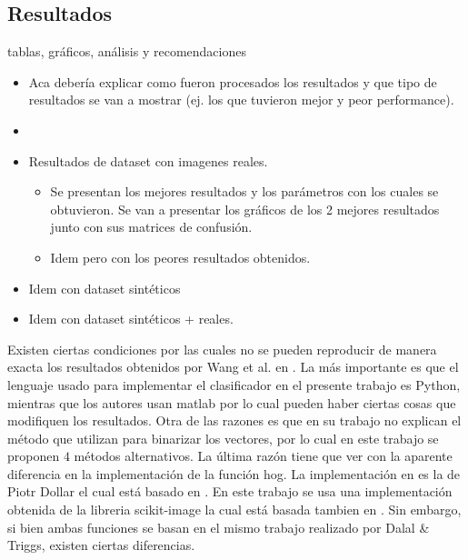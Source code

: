 \newpage
\subsection{Resultados}

\label{subsection:resultados}
	tablas, gráficos, análisis y recomendaciones
	\begin{itemize}
		\item Aca debería explicar como fueron procesados los
                  resultados y que tipo de resultados se van a mostrar (ej. los
                  que tuvieron mejor y peor performance). 
                \item {}
		\item Resultados de dataset con imagenes reales.
		\begin{itemize}
			\item Se presentan los mejores resultados y los parámetros con los cuales se obtuvieron. Se van a presentar los gráficos de los 2 mejores resultados junto con sus matrices de confusión.
			\item Idem pero con los peores resultados obtenidos.
		\end{itemize}
		\item Idem con dataset sintéticos
		\item Idem con dataset sintéticos + reales.

	\end{itemize}
	
	Existen ciertas condiciones por las cuales no se pueden reproducir de manera exacta los resultados obtenidos por Wang et al. en \cite{wang}. La más importante es que el lenguaje usado para implementar el clasificador en el presente trabajo es Python, mientras que los autores usan matlab por lo cual pueden haber ciertas cosas que modifiquen los resultados. Otra de las razones es que en su trabajo no explican el método que utilizan para binarizar los vectores, por lo cual en este trabajo se proponen $4$ métodos alternativos. La última razón tiene que ver con la aparente diferencia en la implementación de la función hog. La implementación en \cite{wang} es la de Piotr Dollar el cual está basado en \cite{DT05}. En este trabajo se usa una implementación obtenida de la libreria scikit-image la cual está basada tambien en \cite{DT05}. Sin embargo, si bien ambas funciones se basan en el mismo trabajo realizado por Dalal \& Triggs, existen ciertas diferencias.
	
